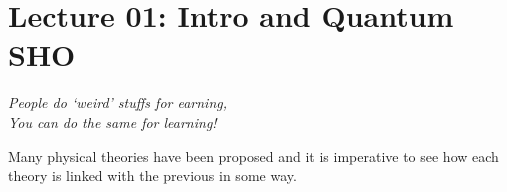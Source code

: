 \section*{Lecture 01: Intro and Quantum SHO}
\begin{center}
    \textit{People do `weird' stuffs for earning,\\
    You can do the same for learning!}
\end{center}
Many physical theories have been proposed and it is imperative to see how each theory is linked with the previous in some way. 

\begin{figure}[H]
    \centering 



\begin{tikzpicture}[x=0.75pt,y=0.75pt,yscale=-1,xscale=1]


\end{tikzpicture}
\end{figure}
